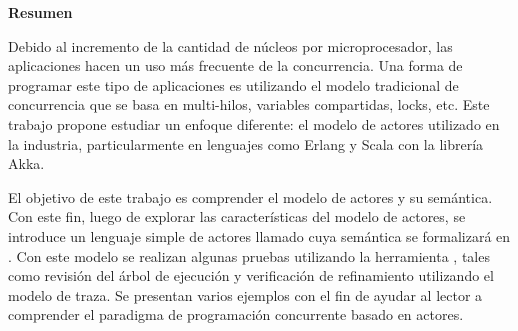 \begin{center}
\begin{LARGE}\textbf{Resumen}\end{LARGE}
\end{center}

\noindent
Debido al incremento de la cantidad de núcleos por microprocesador, las aplicaciones hacen un uso más frecuente de la concurrencia. Una forma de programar este tipo de aplicaciones es utilizando el modelo tradicional de concurrencia que se basa en multi-hilos, variables compartidas, locks, etc. Este trabajo propone estudiar un enfoque diferente: el modelo de actores utilizado en la industria, particularmente en lenguajes como Erlang y Scala con la librería Akka. 

\noindent
El objetivo de este trabajo es comprender el modelo de actores y su semántica. Con este fin, luego de explorar las características del modelo de actores, se introduce un lenguaje simple de actores llamado \SAL cuya semántica se formalizará en \CSP. Con este modelo se realizan algunas pruebas utilizando la herramienta \FDR, tales como revisión del árbol de ejecución y verificación de refinamiento utilizando el modelo de traza. Se presentan varios ejemplos con el fin de ayudar al lector a comprender el paradigma de programación concurrente basado en actores.